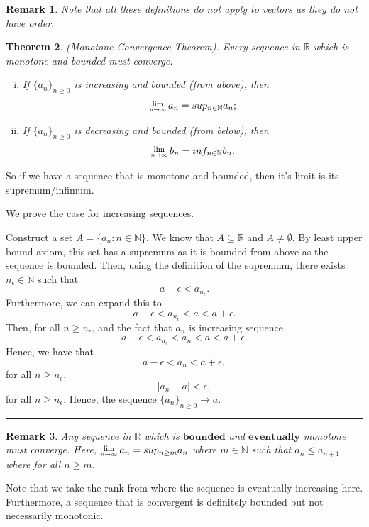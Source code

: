 \documentclass[twoside]{article}
\newcounter{lecnum}
\newcommand{\Lim}[1]{\raisebox{0.5ex}{\scalebox{0.8}{$\displaystyle \lim_{#1}\;$}}}
\newtheorem{theorem}{Theorem}[lecnum]
\newtheorem{remark}[theorem]{Remark}
\newenvironment{proof}{{\bf Proof:}}{\hfill\rule{2mm}{2mm}}
\begin{document}
\begin{remark}
Note that all these definitions do not apply to vectors as they do not have order.
\end{remark}

\begin{theorem}
(Monotone Convergence Theorem). Every sequence in $\mathbb{R}$ which is monotone and bounded must converge.\
\begin{enumerate}[(i)]
  \item If $\{a_n\}_{n \geq 0}$ is increasing and bounded (from above), then
  $$
  \Lim{n \rightarrow \infty}a_n = sup_{n \in \mathbb{N}}a_n;
  $$
  \item If $\{a_n\}_{n \geq 0}$ is decreasing and bounded (from below), then
  $$
  \Lim{n \rightarrow \infty}b_n = inf_{n \in \mathbb{N}}b_n.
  $$
\end{enumerate}
\end{theorem}

So if we have a sequence that is monotone and bounded, then it's limit is its supremum/infimum.

\begin{proof}
We prove the case for increasing sequences. 

Construct a set $A = \{a_n: n \in \mathbb{N}\}$. We know that $A \subseteq \mathbb{R}$ and $A \neq \emptyset$. By least upper bound axiom, this set has a supremum as it is bounded from above as the sequence is bounded. Then, using the definition of the supremum, there exists $n_{\epsilon}  \in \mathbb{N}$ such that
$$
a - \epsilon < a_{n_\epsilon}.
$$
Furthermore, we can expand this to 
$$
a - \epsilon < a_{n_\epsilon} < a < a + \epsilon.
$$
Then, for all $n \geq n_{\epsilon}$, and the fact that $a_n$ is increasing sequence
$$
a - \epsilon < a_{n_\epsilon} < a_n < a < a + \epsilon.
$$
Hence, we have that
$$
a - \epsilon < a_n < a + {\epsilon},
$$
for all $n \geq n_{\epsilon}$.
$$
| a_n - a | < \epsilon,
$$
for all $n \geq n_{\epsilon}.$
Hence, the sequence $\{a_n\}_{n \geq 0} \rightarrow a$.
\end{proof}

\begin{remark}
Any sequence in $\mathbb{R}$ which is $\textbf{bounded}$ and $\textbf{eventually}$ monotone must converge. Here, $\Lim{n \rightarrow \infty}a_n = sup_{n \geq m}a_n
$ where $m \in \mathbb{N}$ such that $a_n \leq a_{n+1}$ where for all $n \geq m$.

\end{remark}

Note that we take the rank from where the sequence is eventually increasing here. Furthermore, a sequence that is convergent is definitely bounded but not necessarily monotonic.
\end{document}
